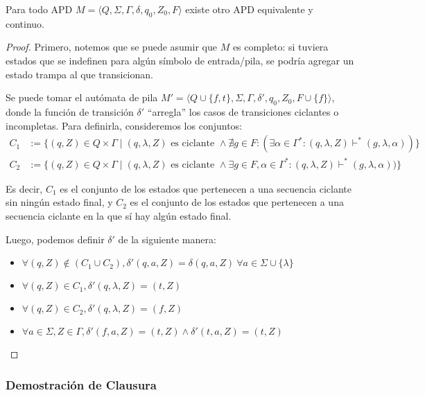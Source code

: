 \begin{lemma*}
    Para todo APD $M = \langle Q, \Sigma, \Gamma, \delta, q_0, Z_0, F \rangle$ existe otro APD equivalente y continuo.
\end{lemma*}
\begin{proof}
    Primero, notemos que se puede asumir que $M$ es completo: si tuviera estados que se indefinen para algún símbolo de entrada/pila, se podría agregar un estado trampa al que transicionan.
    
    Se puede tomar el autómata de pila $M' = \langle Q \cup \{f, t\}, \Sigma, \Gamma, \delta', q_0, Z_0, F \cup \{f\} \rangle$, donde la función de transición $\delta'$ ``arregla'' los casos de transiciones ciclantes o incompletas. Para definirla, consideremos los conjuntos:
    $$
    \begin{aligned}
        C_1 & := \{(q, Z) \in Q \times \Gamma \mid (q, \lambda, Z) \text{ es ciclante } \land \nexists g \in F : (\exists \alpha \in \Gamma^* : (q, \lambda, Z) \vdash^* (g, \lambda, \alpha)) \} \\
        C_2 & := \{(q, Z) \in Q \times \Gamma \mid (q, \lambda, Z) \text{ es ciclante } \land \exists g \in F, \alpha \in \Gamma^* : (q, \lambda, Z) \vdash^* (g, \lambda, \alpha)) \}
    \end{aligned}
    $$

    Es decir, $C_1$ es el conjunto de los estados que pertenecen a una secuencia ciclante sin ningún estado final, y $C_2$ es el conjunto de los estados que pertenecen a una secuencia ciclante en la que sí hay algún estado final.

    Luego, podemos definir $\delta'$ de la siguiente manera:
    \begin{itemize}
        \item $\forall (q, Z) \notin (C_1 \cup C_2), \delta'(q, a, Z) = \delta(q, a, Z)\ \forall a \in \Sigma \cup \{\lambda\}$
        \item $\forall (q, Z) \in C_1, \delta'(q, \lambda, Z) = (t, Z)$
        \item $\forall (q, Z) \in C_2, \delta'(q, \lambda, Z) = (f, Z)$
        \item $\forall a \in \Sigma, Z \in \Gamma, \delta'(f, a, Z) = (t, Z) \land \delta'(t, a, Z) = (t, Z)$
    \end{itemize}
\end{proof}

\subsubsection{Demostración de Clausura}


